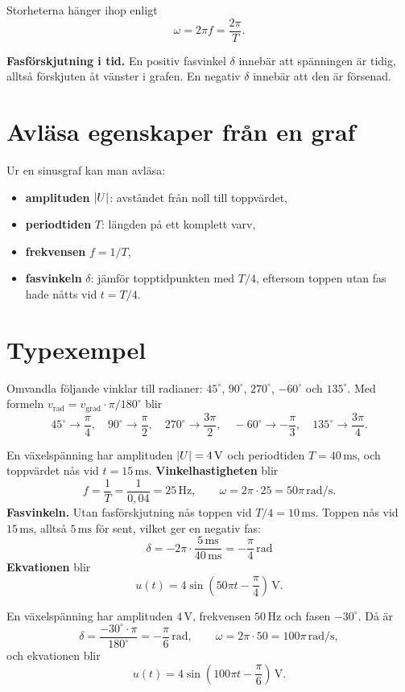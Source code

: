 Storheterna hänger ihop enligt
\[
  \omega = 2\pi f = \frac{2\pi}{T}.
\]

\textbf{Fasförskjutning i tid.} En positiv fasvinkel $\delta$ innebär att spänningen är tidig,
alltså förskjuten åt vänster i grafen. En negativ $\delta$ innebär att den är försenad.

\section{Avläsa egenskaper från en graf}
\label{c9:sec:graf}
Ur en sinusgraf kan man avläsa:
\begin{itemize}
  \item \textbf{amplituden} $\lvert U\rvert$: avståndet från noll till toppvärdet,
  \item \textbf{periodtiden} $T$: längden på ett komplett varv,
  \item \textbf{frekvensen} $f = 1/T$,
  \item \textbf{fasvinkeln} $\delta$: jämför topptidpunkten med $T/4$, eftersom toppen utan fas
    hade nåtts vid $t = T/4$.
\end{itemize}

\section{Typexempel}
\label{c9:sec:typexempel}

\begin{exempel}[Vinkelomvandlingar]
Omvandla följande vinklar till radianer: $45^{\circ}$, $90^{\circ}$, $270^{\circ}$, $-60^{\circ}$
och $135^{\circ}$. Med formeln $v_{\text{rad}} = v_{\text{grad}} \cdot \pi/180^{\circ}$ blir
\[
  45^{\circ} \to \frac{\pi}{4}, \quad 90^{\circ} \to \frac{\pi}{2}, \quad
  270^{\circ} \to \frac{3\pi}{2}, \quad -60^{\circ} \to -\frac{\pi}{3}, \quad
  135^{\circ} \to \frac{3\pi}{4}.
\]
\end{exempel}

\begin{exempel}
En växelspänning har amplituden $\lvert U\rvert = 4\,\text{V}$ och periodtiden $T = 40\,\text{ms}$, och
toppvärdet nås vid $t = 15\,\text{ms}$. \textbf{Vinkelhastigheten} blir
\[
  f = \frac{1}{T} = \frac{1}{0{,}04} = 25\,\text{Hz}, \qquad
  \omega = 2\pi \cdot 25 = 50\pi\,\text{rad/s}.
\]
\textbf{Fasvinkeln.} Utan fasförskjutning nås toppen vid $T/4 = 10\,\text{ms}$. Toppen nås vid
$15\,\text{ms}$, alltså $5\,\text{ms}$ för sent, vilket ger en negativ fas:
\[
  \delta = -2\pi \cdot \frac{5\,\text{ms}}{40\,\text{ms}} = -\frac{\pi}{4}\,\text{rad}
\]
\textbf{Ekvationen} blir
\[
  u(t) = 4\sin\left(50\pi t - \frac{\pi}{4}\right)\,\text{V}.
\]
\end{exempel}

\begin{exempel}
En växelspänning har amplituden $4\,\text{V}$, frekvensen $50\,\text{Hz}$ och fasen
$-30^{\circ}$. Då är
\[
  \delta = \frac{-30^{\circ} \cdot \pi}{180^{\circ}} = -\frac{\pi}{6}\,\text{rad}, \qquad
  \omega = 2\pi \cdot 50 = 100\pi\,\text{rad/s},
\]
och ekvationen blir
\[
  u(t) = 4\sin\left(100\pi t - \frac{\pi}{6}\right)\,\text{V}.
\]
\end{exempel}
